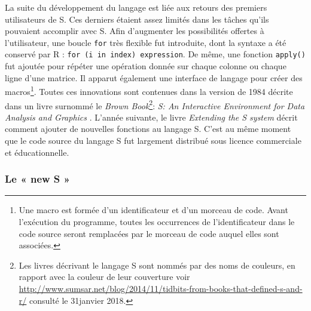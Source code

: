 \documentclass[]{article}
\begin{document}
La suite du développement du langage est liée aux retours des premiers utilisateurs de S.
Ces derniers étaient assez limités dans les tâches qu'ils pouvaient accomplir avec S.
Afin d'augmenter les possibilités offertes à l'utilisateur, une boucle \texttt{for} très flexible fut introduite, dont la syntaxe a été conservé par R : \texttt{for\ (i\ in\ index)\ expression}.
De même, une fonction \texttt{apply()} fut ajoutée pour répéter une opération donnée sur chaque colonne ou chaque ligne d'une matrice. Il apparut également une interface de langage pour créer des macros\footnote{Une macro est formée d'un identificateur et d'un morceau de code. Avant l'exécution du programme, toutes les occurrences de l'identificateur dans le code source seront remplacées par le morceau de code auquel elles sont associées.}. Toutes ces innovations sont contenues dans la version de 1984 décrite dans un livre surnommé le \emph{Brown Book}\footnote{Les livres décrivant le langage S sont nommés par des noms de couleurs, en rapport avec la couleur de leur couverture voir \url{http://www.sumsar.net/blog/2014/11/tidbits-from-books-that-defined-s-and-r/}
  consulté le 31janvier 2018.}: \emph{S: An Interactive Environment for Data Analysis and Graphics} \citep{becker_s_1984}. L'année suivante, le livre \emph{Extending the S system} \citep{becker_extending_1985} décrit comment ajouter de nouvelles fonctions au langage S. C'est au même moment que le code source du langage S fut largement distribué sous licence commerciale et éducationnelle.

\hypertarget{le-new-s}{%
\subsubsection{Le « new S »}\label{le-new-s}}
\end{document}
